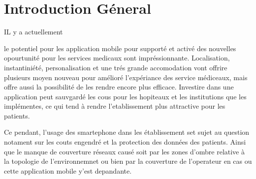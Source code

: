 \chapter{Introduction Géneral}
IL y a actuellement

le potentiel pour les application mobile pour supporté et activé des nouvelles opourtunité pour les services medicaux sont impréssionnante. Localisation, instantiniété, personalisation et une trés grande accomodation vont offrire plusieurs moyen nouveau pour amélioré l'expériance des service médiceaux, mais offre aussi la possibilité de les rendre encore plus efficace.
Investire dans une application peut sauvgardé les cous pour les hopiteaux et les institutions que les implémentes, ce qui tend à rendre l'etablissement plus attractive pour les patients.

Ce pendant, l'usage des smartephone dans les établissement set sujet au question notament sur les couts engendré et la protection des données des patients. Ainsi que le manque de couverture réseaux causé soit par les zones d'ombre relative à la topologie de l'environnemnet ou bien par la couverture de l'operateur en cas ou cette application mobile y'est depandante.
